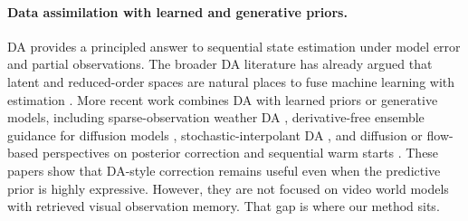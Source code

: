 \documentclass{article}
\begin{document}
\paragraph{Data assimilation with learned and generative priors.}
DA provides a principled answer to sequential state estimation under model error and partial observations. The broader DA literature has already argued that latent and reduced-order spaces are natural places to fuse machine learning with estimation \citep{buizza2022data}. More recent work combines DA with learned priors or generative models, including sparse-observation weather DA \citep{manshausen2024generative}, derivative-free ensemble guidance for diffusion models \citep{zheng2024ensemble}, stochastic-interpolant DA \citep{chen2025flowdas}, and diffusion or flow-based perspectives on posterior correction and sequential warm starts \citep{hodyss2025using, scholz2025warm, huang2026accelerated}. These papers show that DA-style correction remains useful even when the predictive prior is highly expressive. However, they are not focused on video world models with retrieved visual observation memory. That gap is where our method sits.
\end{document}
